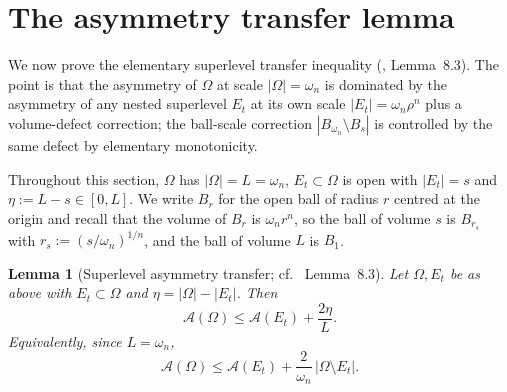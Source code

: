 \documentclass[11pt]{article}
\newtheorem{lemma}[theorem]{Lemma}
\theoremstyle{definition}
\newcommand{\Fr}{\mathcal{A}}
\newcommand{\Om}{\Omega}
\begin{document}
\section{The asymmetry transfer lemma}\label{sec:transfer}

We now prove the elementary superlevel transfer inequality
(\cite{LevelSetIdentity}, Lemma~8.3). The point is that the
asymmetry of $\Om$ at scale $|\Om|=\omega_n$ is dominated by the
asymmetry of any nested superlevel $E_t$ at its own scale
$|E_t|=\omega_n\rho^n$ plus a volume-defect correction; the
ball-scale correction $|B_{\omega_n}\setminus B_s|$ is controlled by
the same defect by elementary monotonicity.

Throughout this section, $\Om$ has $|\Om|=L=\omega_n$, $E_t\subset\Om$
is open with $|E_t|=s$ and $\eta:=L-s\in[0,L]$. We write $B_r$ for the
open ball of radius $r$ centred at the origin and recall that the
volume of $B_r$ is $\omega_n r^n$, so the ball of volume $s$ is
$B_{r_s}$ with $r_s:=(s/\omega_n)^{1/n}$, and the ball of volume $L$ is
$B_1$.

\begin{lemma}[Superlevel asymmetry transfer; cf.\
\cite{LevelSetIdentity} Lemma~8.3]\label{lem:8.3}
Let $\Om,E_t$ be as above with $E_t\subset\Om$ and $\eta=|\Om|-|E_t|$.
Then
\begin{equation}\label{eq:8.3}
\Fr(\Om)\le \Fr(E_t)+\frac{2\eta}{L}.
\end{equation}
Equivalently, since $L=\omega_n$,
\begin{equation}\label{eq:8.3-omega}
\Fr(\Om)\le \Fr(E_t)+\frac{2}{\omega_n}\,|\Om\setminus E_t|.
\end{equation}
\end{lemma}
\end{document}
